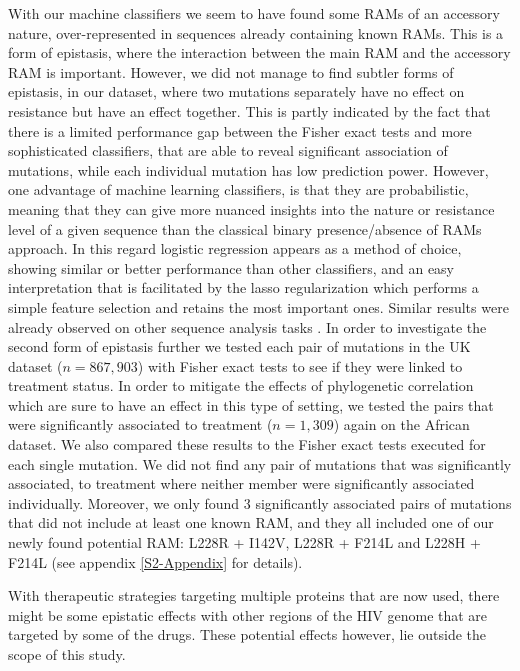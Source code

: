 \documentclass[
  11pt,
  twoside,
  BCOR=10mm,
  listof=totoc]{scrbook}
\begin{document}
With our machine classifiers we seem to have found some RAMs of an
accessory nature, over-represented in sequences already containing known
RAMs. This is a form of epistasis, where the interaction between the
main RAM and the accessory RAM is important. However, we did not manage
to find subtler forms of epistasis, in our dataset, where two mutations
separately have no effect on resistance but have an effect together.
This is partly indicated by the fact that there is a limited performance
gap between the Fisher exact tests and more sophisticated classifiers,
that are able to reveal significant association of mutations, while each
individual mutation has low prediction power. However, one advantage of
machine learning classifiers, is that they are probabilistic, meaning
that they can give more nuanced insights into the nature or resistance
level of a given sequence than the classical binary presence/absence of
RAMs approach. In this regard logistic regression appears as a method of
choice, showing similar or better performance than other classifiers,
and an easy interpretation that is facilitated by the lasso
regularization which performs a simple feature selection and retains the
most important ones. Similar results were already observed on other
sequence analysis tasks \autocite{wuGenomewideAssociationAnalysis2009}. In order
to investigate the second form of epistasis further we tested each pair
of mutations in the UK dataset (\(n=867,903\)) with Fisher exact tests to
see if they were linked to treatment status. In order to mitigate the
effects of phylogenetic correlation which are sure to have an effect in
this type of setting, we tested the pairs that were significantly
associated to treatment (\(n=1,309\)) again on the African dataset. We
also compared these results to the Fisher exact tests executed for each
single mutation. We did not find any pair of mutations that was
significantly associated, to treatment where neither member were
significantly associated individually. Moreover, we only found 3
significantly associated pairs of mutations that did not include at
least one known RAM, and they all included one of our newly found
potential RAM: L228R + I142V, L228R + F214L and L228H + F214L (see appendix \ref{S2-Appendix} for
details).

With therapeutic strategies targeting multiple proteins that are now
used, there might be some epistatic effects with other regions of the
HIV genome that are targeted by some of the drugs. These potential
effects however, lie outside the scope of this study.
\end{document}
